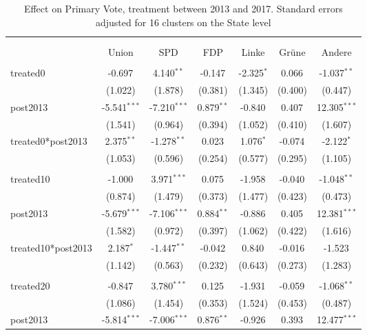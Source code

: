 \documentclass[12pt]{article}
\begin{document}
 
\begin{table}[!htbp] \centering
  \caption{Effect on Primary Vote, treatment between 2013 and 2017. Standard errors adjusted for 16 clusters on the State level}
\begin{tabular}{@{\extracolsep{5pt}}lcccccc}
\\[-1.8ex]\hline
\hline \\[-1.8ex]
\\[-1.8ex] & \multicolumn{1}{c}{Union} & \multicolumn{1}{c}{SPD} & \multicolumn{1}{c}{FDP} & \multicolumn{1}{c}{Linke} & \multicolumn{1}{c}{Grüne} & \multicolumn{1}{c}{Andere}  \\
\hline \\[-1.8ex]
 treated0 & -0.697$^{}$ & 4.140$^{**}$ & -0.147$^{}$ & -2.325$^{*}$ & 0.066$^{}$ & -1.037$^{**}$ \\
  & (1.022) & (1.878) & (0.381) & (1.345) & (0.400) & (0.447) \\
 post2013 & -5.541$^{***}$ & -7.210$^{***}$ & 0.879$^{**}$ & -0.840$^{}$ & 0.407$^{}$ & 12.305$^{***}$ \\
  & (1.541) & (0.964) & (0.394) & (1.052) & (0.410) & (1.607) \\
 treated0*post2013 & 2.375$^{**}$ & -1.278$^{**}$ & 0.023$^{}$ & 1.076$^{*}$ & -0.074$^{}$ & -2.122$^{*}$ \\
  & (1.053) & (0.596) & (0.254) & (0.577) & (0.295) & (1.105) \\
\hline \\[-1.8ex]
 treated10 & -1.000$^{}$ & 3.971$^{***}$ & 0.075$^{}$ & -1.958$^{}$ & -0.040$^{}$ & -1.048$^{**}$ \\
  & (0.874) & (1.479) & (0.373) & (1.477) & (0.423) & (0.473) \\
 post2013 & -5.679$^{***}$ & -7.106$^{***}$ & 0.884$^{**}$ & -0.886$^{}$ & 0.405$^{}$ & 12.381$^{***}$ \\
  & (1.582) & (0.972) & (0.397) & (1.062) & (0.422) & (1.616) \\
 treated10*post2013 & 2.187$^{*}$ & -1.447$^{**}$ & -0.042$^{}$ & 0.840$^{}$ & -0.016$^{}$ & -1.523$^{}$ \\
  & (1.142) & (0.563) & (0.232) & (0.643) & (0.273) & (1.283) \\
\hline \\[-1.8ex]
 treated20 & -0.847$^{}$ & 3.780$^{***}$ & 0.125$^{}$ & -1.931$^{}$ & -0.059$^{}$ & -1.068$^{**}$ \\
  & (1.086) & (1.454) & (0.353) & (1.524) & (0.453) & (0.487) \\
 post2013 & -5.814$^{***}$ & -7.006$^{***}$ & 0.876$^{**}$ & -0.926$^{}$ & 0.393$^{}$ & 12.477$^{***}$ \\

\end{tabular}
\end{table}
\end{document}
